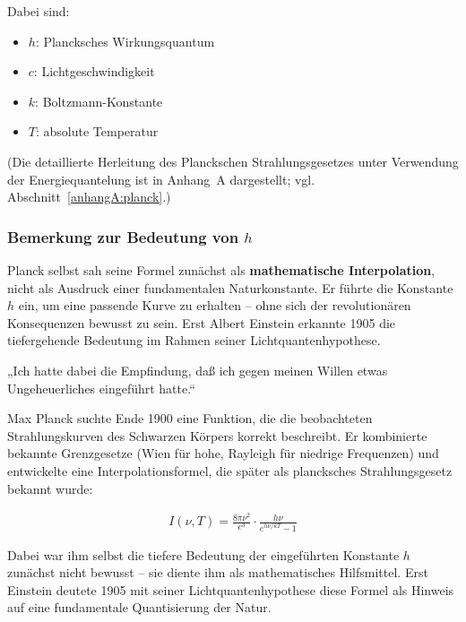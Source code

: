 Dabei sind:
\begin{itemize}
	\item \( h \): Plancksches Wirkungsquantum
	\item \( c \): Lichtgeschwindigkeit
	\item \( k \): Boltzmann-Konstante
	\item \( T \): absolute Temperatur
\end{itemize}
\raggedbottom
(Die detaillierte Herleitung des Planckschen Strahlungsgesetzes unter Verwendung der Energiequantelung ist in Anhang~A dargestellt; vgl. Abschnitt~\ref{anhangA:planck}.)
\subsubsection{Bemerkung zur Bedeutung von \( h \)}
\raggedbottom

Planck selbst sah seine Formel zunächst als \textbf{mathematische Interpolation}, nicht als Ausdruck einer fundamentalen Naturkonstante. Er führte die Konstante \( h \) ein, um eine passende Kurve zu erhalten – ohne sich der revolutionären Konsequenzen bewusst zu sein. Erst Albert Einstein erkannte 1905 die tiefergehende Bedeutung im Rahmen seiner Lichtquantenhypothese.\\
\vspace{-0.3em}
\begin{tcolorbox}[physikbox,title={Max Planck – Wissenschaftliche Selbstbiographie \cite{Planck1948}}]
	\label{box:planck-zitat}
	„Ich hatte dabei die Empfindung, daß ich gegen meinen Willen etwas Ungeheuerliches eingeführt hatte.“
\end{tcolorbox}
\vspace{1em}
\begin{tcolorbox}[mathebox, title={Plancks Strahlungsgesetz: Eine mathematische Interpolation \cite{Hoffmann2008}}]
	\label{box:planck-interpolation}
	Max Planck suchte Ende 1900 eine Funktion, die die beobachteten Strahlungskurven des Schwarzen Körpers korrekt beschreibt. Er kombinierte bekannte Grenzgesetze (Wien für hohe, Rayleigh für niedrige Frequenzen) und entwickelte eine Interpolationsformel, die später als plancksches Strahlungsgesetz bekannt wurde:
	
	\begin{align}
		I(\nu, T) = \frac{8\pi \nu^2}{c^3} \cdot \frac{h\nu}{e^{h\nu/kT} - 1}
	\end{align}
	
	Dabei war ihm selbst die tiefere Bedeutung der eingeführten Konstante \( h \) zunächst nicht bewusst – sie diente ihm als mathematisches Hilfsmittel. Erst Einstein deutete 1905 mit seiner Lichtquantenhypothese diese Formel als Hinweis auf eine fundamentale Quantisierung der Natur.
\end{tcolorbox}
